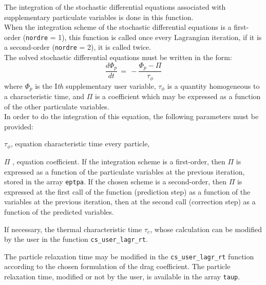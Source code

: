 \noindent
The integration of the stochastic differential equations associated with
supplementary particulate variables is done in this function. \\
When the integration scheme of the stochastic differential equations is
a first-order (\texttt{nordre} = 1), this function is called once every
Lagrangian iteration, if it is a second-order (\texttt{nordre} = 2), it is called
twice. \\

\noindent
The solved stochastic differential equations must be written in the
form:
\begin{displaymath}
\frac{d \Phi_p}{dt} \,=\, - \frac{\Phi_p - \Pi}{\tau_\phi}
\end{displaymath}
where $\Phi_p$ is the I\textit{th} supplementary user variable,
$\tau_\phi$ is a quantity homogeneous to a characteristic time, and $\Pi$ is
a coefficient which may be expressed as a function of the other
particulate variables. \\
In order to do the integration of this equation, the following
parameters must be provided:
\begin{list}{-}{}
\item $\tau_\phi$, equation characteristic time
      every particle,
\item $\Pi$ , equation coefficient. If the
      integration scheme is a first-order, then $\Pi$ is expressed as a
      function of the particulate variables at the previous iteration,
      stored in the array \texttt{eptpa}. If the chosen scheme is a second-order,
      then $\Pi$ is expressed at the first call of the function
      (prediction step) as a function of the variables at the
      previous iteration, then at the second call
      (correction step) as a function of the predicted variables.
\end{list}

\noindent
If necessary, the thermal characteristic time $\tau_c$, whose calculation can be modified by the user in the function
\texttt{cs\_user\_lagr\_rt}.


\noindent
The particle relaxation time may be modified in the \texttt{cs\_user\_lagr\_rt} function according to the chosen formulation of the drag coefficient. The particle relaxation time, modified or not by the user, is available in the array \texttt{taup}.


